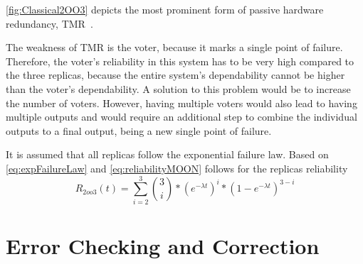 \autoref{fig:Classical2OO3} depicts the most prominent form of passive hardware redundancy, \gls*{TMR}~\cite{BarryFaultToleranceAnalysis}.


The weakness of \gls*{TMR} is the voter, because it marks a single point of failure.
Therefore, the voter's reliability in this system has to be very high compared to the three replicas, because the entire system's dependability cannot be higher than the voter's dependability.
A solution to this problem would be to increase the number of voters.
However, having multiple voters would also lead to having multiple outputs and would require an additional step to combine the individual outputs to a final output, being a new single point of failure.

It is assumed that all replicas follow the exponential failure law.
Based on \autoref{eq:expFailureLaw} and \autoref{eq:reliabilityMOON} follows for the replicas reliability
\begin{equation}
R_{2oo3}(t) = \sum_{i = 2}^3 {3 \choose i} * (e^{-\lambda t})^i * (1 - e^{-\lambda t})^{3 - i}
\end{equation}

%
%
%


\section{Error Checking and Correction}







\fi
